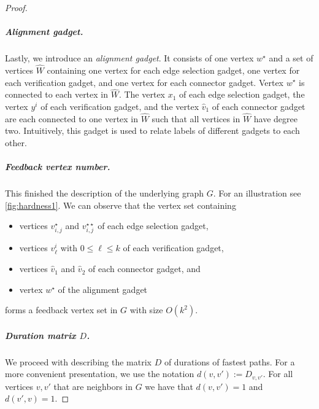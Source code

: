 \documentclass[a4paper,UKenglish,cleveref, autoref, thm-restate, anonymous]{lipics-v2021}
\begin{document}
\begin{proof}
\subparagraph{Alignment gadget.} Lastly, we introduce an \emph{alignment gadget}. It consists of one vertex $w^\star$ and a set of vertices $\hat{W}$ containing one vertex for each edge selection gadget, one vertex for each verification gadget, and one vertex for each connector gadget. Vertex $w^\star$ is connected to each vertex in $\hat{W}$.
The vertex $x_1$ of each edge selection gadget, the vertex $y^i$ of each verification gadget, and the vertex $\hat{v}_1$ of each connector gadget are each connected to  one vertex in $\hat{W}$ such that all vertices in $\hat{W}$ have degree two. Intuitively, this gadget is used to relate labels of different gadgets to each other. 

\subparagraph{Feedback vertex number.} This finished the description of the underlying graph $G$. For an illustration see \cref{fig:hardness1}. We can observe that the vertex set containing
\begin{itemize}
    \item vertices $v_{i,j}^\star$ and $v_{i,j}^{\star\star}$ of each edge selection gadget,
    \item vertices $v^i_\ell$ with $0\le \ell\le k$ of each verification gadget,
    \item vertices $\hat{v}_1$ and $\hat{v}_2$ of each connector gadget, and
    \item vertex $w^\star$ of the alignment gadget
\end{itemize}
forms a feedback vertex set in $G$ with size $O(k^2)$.

\subparagraph{\boldmath Duration matrix $D$.} We proceed with describing the matrix $D$ of durations of fastest paths. For a more convenient presentation, we use the notation $d(v,v'):= D_{v,v'}$. For all vertices $v,v'$ that are neighbors in $G$ we have that $d(v,v')=1$ and $d(v',v)=1$.


\end{proof}
\end{document}
